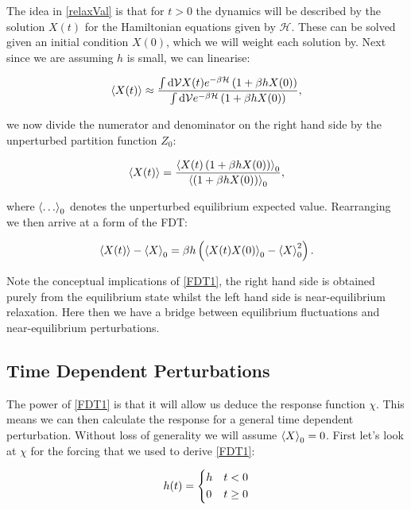 \noindent The idea in \ref{relaxVal} is that for $t >0$ the dynamics will be described by the solution $X(t)$ for the Hamiltonian equations given by $\mathcal{H}$. These can be solved given an initial condition $X(0)$, which we will weight each solution by. Next since we are assuming $h$ is small, we can linearise:

\begin{align}
\expval{X(t)} \approx \frac{\int \dd \mathcal{V} X(t) e^{-\beta \mathcal{H} } \left(1 +\beta h X(0) \right)  }{\int \dd \mathcal{V} e^{-\beta\mathcal{H} } \left(1 +\beta h X(0) \right)},
\end{align}

\noindent we now divide the numerator and denominator on the right hand side by the unperturbed partition function $Z_0$:

\begin{align}
\expval{X(t)} = \frac{\expval{X(t) \left(1 +\beta h X(0) \right) }_0}{\expval{\left(1 +\beta h X(0) \right)}_0},
\end{align}

\noindent where $\expval{ \ldots }_0$ denotes the unperturbed equilibrium expected value. Rearranging we then arrive at a form of the FDT:

\begin{align}
\expval{X(t)} - \expval{X}_0 = \beta h \left( \expval{X(t)X(0)}_0 - \expval{X}_0 ^2 \right).\label{FDT1}
\end{align}

Note the conceptual implications of \ref{FDT1}, the right hand side is obtained purely from the equilibrium state whilst the left hand side is near-equilibrium relaxation. Here then we have a bridge between equilibrium fluctuations and near-equilibrium perturbations. 

\subsection{Time Dependent Perturbations}

The power of \ref{FDT1} is that it will allow us deduce the response function $\chi$. This means we can then calculate the response for a general time dependent perturbation.  Without loss of generality we will assume $\expval{X}_0 = 0$. First let's look at $\chi$ for the forcing that we used to derive \ref{FDT1}:

\begin{align}
h(t) = 
\begin{dcases}
h & t<0 \\
0 & t \geq 0
\end{dcases}
\end{align}

